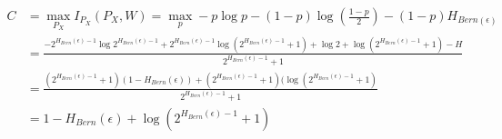 \documentclass[
  course = {{EE623 Information Theory}},
  quartile = {{Fall 2020}},
  assignment = 6,
  name = {{Mohammad Mahdi Rahimi}},
  studentnumber = {{20208244}},
  email = {{mahi@kaist.ac.kr}},
  firstexercise = 1
]{aga-homework}
\begin{document}
\begin{equation} \label{eq3}
\begin{split}
C & = \max_{P_X}I_{P_X}(P_X, W) = \max_{p} -p\log p - (1 - p)\log(\frac{1-p}{2}) -(1-p)H_{Bern(\epsilon)}\\
& =  \frac{-2^{H_{Bern}(\epsilon) - 1}\log{2^{H_{Bern}(\epsilon) - 1}} + 2^{H_{Bern}(\epsilon) - 1} \log{(2^{H_{Bern}(\epsilon) - 1} + 1)} + \log2 + \log{(2^{H_{Bern}(\epsilon) - 1} + 1)} - H }{2^{H_{Bern}(\epsilon) - 1} + 1}\\
& = \frac{(2^{H_{Bern}(\epsilon) - 1} + 1)(1 - H_{Bern}(\epsilon)) + (2^{H_{Bern}(\epsilon) - 1} + 1)(\log{(2^{H_{Bern}(\epsilon) - 1} + 1)}}{2^{H_{Bern}(\epsilon) - 1} + 1}\\
& = 1 - H_{Bern}(\epsilon) + \log{(2^{H_{Bern}(\epsilon) - 1} + 1)}\\
\end{split}
\end{equation}
\end{document}
